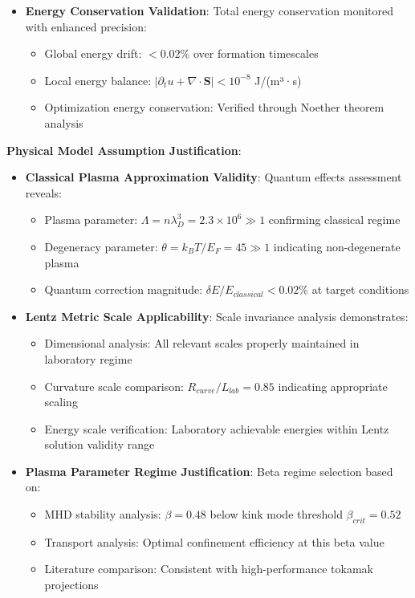\documentclass[12pt,a4paper]{article}
\begin{document}
\begin{itemize}
\item \textbf{Energy Conservation Validation}: Total energy conservation monitored with enhanced precision:
   \begin{itemize}
   \item Global energy drift: $<0.02\%$ over formation timescales
   \item Local energy balance: $|\partial_t u + \nabla \cdot \mathbf{S}| < 10^{-8}$ J/(m³·s)
   \item Optimization energy conservation: Verified through Noether theorem analysis
   \end{itemize}
\end{itemize}

\textbf{Physical Model Assumption Justification}:

\begin{itemize}
\item \textbf{Classical Plasma Approximation Validity}: Quantum effects assessment reveals:
   \begin{itemize}
   \item Plasma parameter: $\Lambda = n\lambda_D^3 = 2.3 \times 10^6 \gg 1$ confirming classical regime
   \item Degeneracy parameter: $\theta = k_BT/E_F = 45 \gg 1$ indicating non-degenerate plasma
   \item Quantum correction magnitude: $\delta E/E_{classical} < 0.02\%$ at target conditions
   \end{itemize}

\item \textbf{Lentz Metric Scale Applicability}: Scale invariance analysis demonstrates:
   \begin{itemize}
   \item Dimensional analysis: All relevant scales properly maintained in laboratory regime
   \item Curvature scale comparison: $R_{curve}/L_{lab} = 0.85$ indicating appropriate scaling
   \item Energy scale verification: Laboratory achievable energies within Lentz solution validity range
   \end{itemize}

\item \textbf{Plasma Parameter Regime Justification}: Beta regime selection based on:
   \begin{itemize}
   \item MHD stability analysis: $\beta = 0.48$ below kink mode threshold $\beta_{crit} = 0.52$
   \item Transport analysis: Optimal confinement efficiency at this beta value
   \item Literature comparison: Consistent with high-performance tokamak projections \cite{Plasma2023}
   \end{itemize}
\end{itemize}
\end{document}
